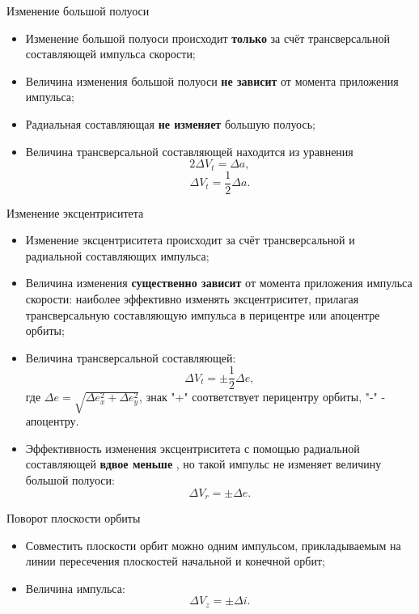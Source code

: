 \documentclass[9pt]{beamer}
\begin{document}
\begin{frame}{Изменение большой полуоси}
\begin{itemize}
    \item Изменение большой полуоси происходит \textbf{только} за счёт трансверсальной составляющей импульса скорости;
    \item Величина изменения большой полуоси \textbf{не зависит} от момента приложения импульса;
    \item Радиальная составляющая \textbf{не изменяет} большую полуось;
    \item Величина трансверсальной составляющей находится из уравнения
    \begin{equation*}
        2 \Delta V_t = \Delta a,
    \end{equation*}
    \begin{equation*}
        \Delta V_t = \frac{1}{2} \Delta a.
    \end{equation*}
\end{itemize}
\end{frame}

\begin{frame}{Изменение эксцентриситета}
\begin{itemize}
    \item Изменение эксцентриситета происходит за счёт трансверсальной и радиальной составляющих импульса;
    \item Величина изменения \textbf{существенно зависит} от момента приложения импульса скорости: наиболее эффективно изменять эксцентриситет, прилагая трансверсальную составляющую импульса в перицентре или апоцентре орбиты;
    \item Величина трансверсальной составляющей:
    \begin{equation*}
        \Delta V_t = \pm \frac{1}{2} \Delta e,
    \end{equation*}
    где $\Delta e = \sqrt{\Delta e_x^2 + \Delta e_y^2}$, знак "+" соответствует перицентру орбиты, "-" - апоцентру.
    \item Эффективность изменения эксцентриситета с помощью радиальной составляющей \textbf{вдвое меньше} , но такой импульс не изменяет величину большой полуоси:
    \begin{equation*}
        \Delta V_r = \pm \Delta e.
    \end{equation*}
\end{itemize}
\end{frame}

\begin{frame}{Поворот плоскости орбиты}
\begin{itemize}
    \item Совместить плоскости орбит можно одним импульсом, прикладываемым на линии пересечения плоскостей начальной и конечной орбит;
    \item Величина импульса:
    \begin{equation*}
        \Delta V_z = \pm \Delta i.
    \end{equation*}
\end{itemize}
\end{frame}
\end{document}

